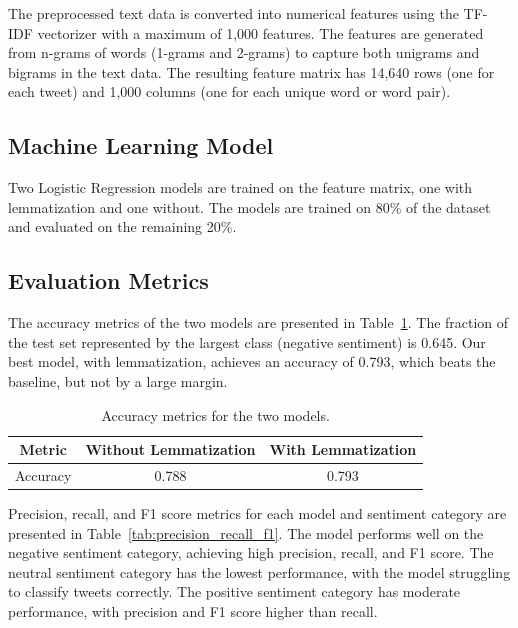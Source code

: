 \documentclass{article}
\begin{document}
The preprocessed text data is converted into numerical features using the TF-IDF vectorizer with a maximum of 1,000 features. The features are generated from n-grams of words (1-grams and 2-grams) to capture both unigrams and bigrams in the text data. The resulting feature matrix has 14,640 rows (one for each tweet) and 1,000 columns (one for each unique word or word pair).

\subsection{Machine Learning Model}

Two Logistic Regression models are trained on the feature matrix, one with lemmatization and one without. The models are trained on 80\% of the dataset and evaluated on the remaining 20\%.

\subsection{Evaluation Metrics}

The accuracy metrics of the two models are presented in Table~\ref{tab:accuracy_metrics}. The fraction of the test set represented by the largest class (negative sentiment) is 0.645. Our best model, with lemmatization, achieves an accuracy of 0.793, which beats the baseline, but not by a large margin.

\begin{table}[H]
    \begin{tabular}{ccc}
        \hline
        \textbf{Metric} & \textbf{Without Lemmatization} & \textbf{With Lemmatization} \\
        \hline
        Accuracy & 0.788 & 0.793 \\
        \hline
    \end{tabular}
    \caption{\label{tab:accuracy_metrics} Accuracy metrics for the two models.}
\end{table}

Precision, recall, and F1 score metrics for each model and sentiment category are presented in Table~\ref{tab:precision_recall_f1}. The model performs well on the negative sentiment category, achieving high precision, recall, and F1 score. The neutral sentiment category has the lowest performance, with the model struggling to classify tweets correctly. The positive sentiment category has moderate performance, with precision and F1 score higher than recall.
\end{document}
